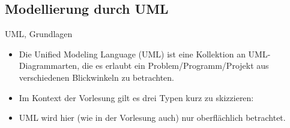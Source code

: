 \subsection{Modellierung durch UML}

\begin{frame}{UML, Grundlagen}
    \begin{itemize}[<+(1)->]
        \item Die Unified Modeling Language (UML) ist eine Kollektion an UML-Diagrammarten,\pause{} die es erlaubt ein Problem/Programm/Projekt aus verschiedenen Blickwinkeln zu betrachten.
        \item Im Kontext der Vorlesung gilt es drei Typen kurz zu skizzieren: 
        \item UML wird hier (wie in der Vorlesung auch) nur oberflächlich betrachtet.
    \end{itemize}
\end{frame}

